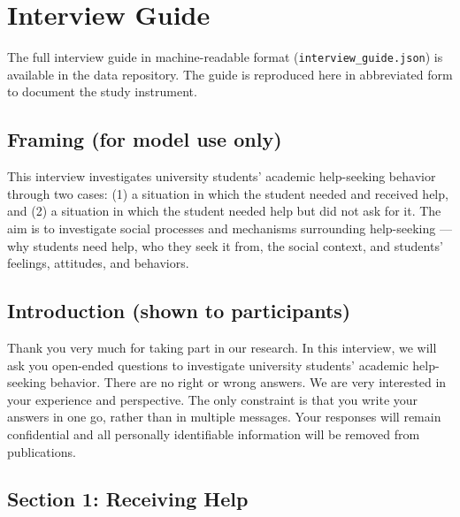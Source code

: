 \documentclass[12pt]{article}
\begin{document}
\section{Interview Guide}
\label{app:guide}

The full interview guide in machine-readable format (\texttt{interview\_guide.json}) is available in the data repository. The guide is reproduced here in abbreviated form to document the study instrument.

\subsection*{Framing (for model use only)}

This interview investigates university students' academic help-seeking behavior through two cases: (1) a situation in which the student needed and received help, and (2) a situation in which the student needed help but did not ask for it. The aim is to investigate social processes and mechanisms surrounding help-seeking --- why students need help, who they seek it from, the social context, and students' feelings, attitudes, and behaviors.

\subsection*{Introduction (shown to participants)}

Thank you very much for taking part in our research. In this interview, we will ask you open-ended questions to investigate university students' academic help-seeking behavior. There are no right or wrong answers. We are very interested in your experience and perspective. The only constraint is that you write your answers in one go, rather than in multiple messages. Your responses will remain confidential and all personally identifiable information will be removed from publications.

\subsection*{Section 1: Receiving Help}
\end{document}
